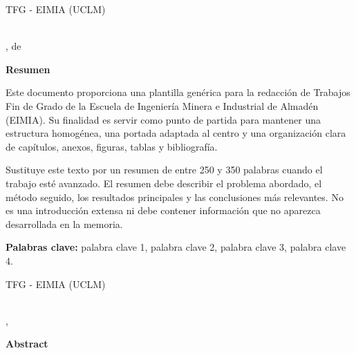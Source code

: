 \pagestyle{plain}

{}
\makeatletter
\begin{center}
    {\textsc{TFG - EIMIA (UCLM)}\par}
    \vspace{1cm}
    {\textbf{\Large\@titulo}\par}
    \vspace{0.4cm}
    {\@autor \\ \@cityTF, \@mesTF{} de \@yearTF\par}
    \vspace{0.9cm}
    {\textbf{\large\textsf{Resumen}}\par}
\end{center}
\makeatother

Este documento proporciona una plantilla genérica para la redacción de Trabajos
Fin de Grado de la Escuela de Ingeniería Minera e Industrial de Almadén
(EIMIA). Su finalidad es servir como punto de partida para mantener una
estructura homogénea, una portada adaptada al centro y una organización clara de
capítulos, anexos, figuras, tablas y bibliografía.

Sustituye este texto por un resumen de entre 250 y 350 palabras cuando el
trabajo esté avanzado. El resumen debe describir el problema abordado, el método
seguido, los resultados principales y las conclusiones más relevantes. No es
una introducción extensa ni debe contener información que no aparezca
desarrollada en la memoria.

\textbf{Palabras clave:}
palabra clave 1,
palabra clave 2,
palabra clave 3,
palabra clave 4.

\cleardoublepage

{}
\makeatletter
\begin{center}
    {\textsc{TFG - EIMIA (UCLM)}\par}
    \vspace{1cm}
    {\textbf{\Large\@tituloIngles}\par}
    \vspace{0.4cm}
    {\@autor \\ \@cityTF, \@monthTF{} \@yearTF\par}
    \vspace{0.9cm}
    {\textbf{\large\textsf{Abstract}}\par}
\end{center}
\makeatother

